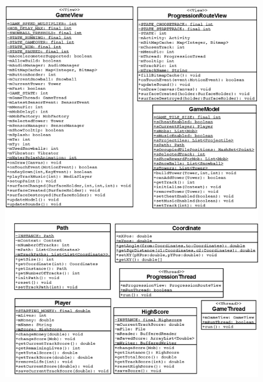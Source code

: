 \clearpage

\begin{figure}[here]

\begin{center}

\includegraphics[scale=0.35]{pics/chapters/AppendixA/uml2}

\end{center}

\end{figure}
